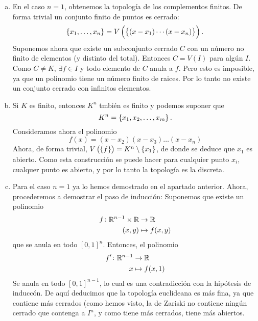 \begin{eje}
\begin{enumerate}[(a)]
\begin{enumerate}[i)]
	    \end{enumerate}
        \item  En el caso $n = 1$, obtenemos la topología de los complementos finitos. De forma trivial un
            conjunto finito de puntos es cerrado:
            \[
                \left\{x_1, \dots, x_n\right\} = V\left( \left\{ (x - x_1) \cdots (x - x_n)\right\} \right).
            \]
            Suponemos ahora que existe un subconjunto
            cerrado $C$ con un número no finito de elementos (y distinto del total). Entonces $C = V(I)$ para
            algún $I$. Como $C \neq K$, $\exists f \in I$ y todo elemento de $C$ anula a $f$. Pero esto es
            imposible, ya que un polinomio tiene un número finito de raices. Por lo tanto no existe un conjunto
            cerrado con infinitos elementos.
        \item Si $K$ es finito, entonces $K^n$ tmbién es finito y podemos suponer que 
            \[
                K^n = \left\{ x_1, x_2, \dots, x_m \right\}.
            \]
            Consideramos ahora el polinomio
            \[
                f(x) = \left( x - x_2 \right) \left( x - x_3 \right) \dots \left( x - x_n \right)
            \]
            Ahora, de forma trivial, $V\left( \left\{f\right\} \right) = K^n \setminus \left\{x_1\right\}$, de donde se deduce
            que $x_1$ es abierto. Como esta construcción se puede hacer para cualquier punto $x_i$, cualquer
            punto es abierto, y por lo tanto la topología es la discreta.

        \item Para el caso $n = 1$ ya lo hemos demostrado en el apartado anterior. Ahora, procederemos a
            demostrar el paso de inducción:
            Suponemos que existe un polinomio
            \[
                \begin{aligned}
                    f \colon \mathbb{R}^{n-1} \times \mathbb{R} &\to \mathbb{R} \\
                    (x, y) &\mapsto f(x, y)
                \end{aligned}
            \]
            que se anula en todo $[0, 1]^n$. Entonces, el polinomio
            \[
                \begin{aligned}
                    f^\prime \colon \mathbb{R}^{n-1} &\to \mathbb{R} \\
                    x &\mapsto f(x, 1)
                \end{aligned}
            \]
            Se anula en todo $[0, 1]^{n-1}$, lo cual es una contradicción con la hipótesis de induccón. De aquí
            deducimos que la topología euclideana es más fina, ya que contiene más cerrados (como hemos visto,
            la de Zariski no contiene ningún cerrado que contenga a $I^n$, y como tiene más cerrados, tiene
            más abiertos.


\end{enumerate}
\end{eje}

